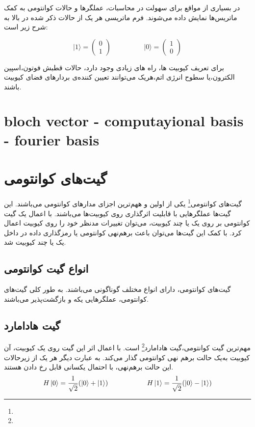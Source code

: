 \documentclass{book}
\begin{document}
در بسیاری از مواقع برای سهولت در محاسبات، عملگر‌ها و حالات کوانتومی به کمک ماتریس‌ها نمایش داده ‌می‌شوند. فرم ماتریسی هر یک از حالات ذکر شده در بالا به شرح زیر است:

\begin{equation}
	\vert 1 \rangle = \begin{pmatrix} 0 \\ 1 \end{pmatrix}
	\hspace{2cm}
	\vert 0 \rangle = \begin{pmatrix} 1 \\ 0 \end{pmatrix}	
\end{equation}

برای تعریف کیوبیت ها، راه های زیادی وجود دارد، حالات قطبش فوتون،‌اسپین الکترون،‌یا سطوح انرژی اتم،‌هریک می‌توانند تعیین کننده‌ی بردار‌های فضای کیوبیت باشند.

\section{bloch vector - computayional basis - fourier basis}
\section{گیت‌های کوانتومی}
گیت‌های کوانتومی\footnote{} یکی از اولین و ههم‌ترین اجزای‌ مدار‌های کوانتومی ‌می‌باشند. این گیت‌ها عملگر‌هایی با قابلیت اثر‌گذاری روی کیوبیت‌ها می‌باشند. با اعمال یک گیت کوانتومی بر روی یک یا چند کیوبیت، می‌توان تغییرات مدنظر خود را روی کیوبیت اعمال کرد. با کمک این گیت‌ها می‌توان باعث برهم‌نهی کوانتومی یا رمز‌گذاری داده در داخل یک یا چند کیوبیت شد.

\subsection{انواع گیت کوانتومی}
گیت‌های کوانتومی، دارای انواع مختلف گوناگونی می‌باشند. به طور کلی گیت‌های کوانتومی، عملگر‌هایی یکه و بازگشت‌پذیر می‌باشند. 
\subsection*{گیت هادامارد}
مهم‌ترین گیت کوانتومی،‌گیت هادامارد\footnote{} است. با اعمال اثر این گیت روی یک کیوبیت، آن کیوبیت به‌یک حالت برهم نهی‌ کوانتومی‌ گذار‌ می‌کند. به عبارت دیگر هر یک از زیرحالات این حالت برهم‌نهی، با احتمال یکسانی قابل رخ دادن‌ هستند. 
\vspace{1cm}
$$
H\ket{0} = \frac{1}{\sqrt{2}} (\ket{0} + \ket{1})
\hspace{2cm}
H\ket{1} = \frac{1}{\sqrt{2}} (\ket{0} - \ket{1})
$$
\vspace{1cm}
\end{document}
